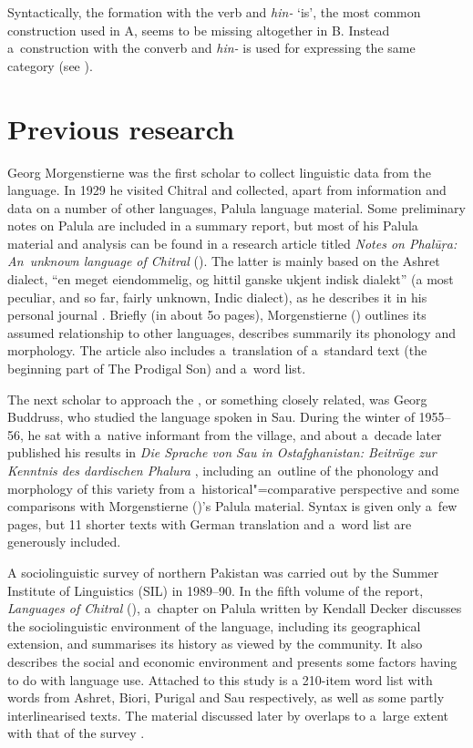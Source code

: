 Syntactically, the  formation with the   verb and \textit{hin-} `is', the most common construction used in A, seems to be missing altogether in B. Instead a~construction with the  converb and \textit{hin-} is used for expressing the same category (see ).


\section{Previous research}
\label{sec:1-5}

Georg Morgenstierne was the first scholar to collect linguistic data from the language. In 1929 he visited Chitral and
collected, apart from information and data on a number of other languages, Palula language material. Some preliminary notes on Palula are included in a summary report, but most of his Palula material and analysis can be found in a research article titled \textit{Notes on Phal\=uṛa: An~unknown \iliDardic language of Chitral}
(\citeyear{morgenstierne1941}). The latter is mainly based on the Ashret dialect, ``en meget eiendommelig, og hittil ganske ukjent indisk dialekt'' (a most peculiar, and so far, fairly unknown, Indic dialect), as he describes it in his personal journal \citep[38]{morgenstiernelorentzen1992}. Briefly (in about 5o pages),
Morgenstierne (\citeyear{morgenstierne1941}) outlines its assumed relationship to other \iliIndoAryan languages, describes summarily its
phonology and morphology. The article also includes a~translation of a~standard text (the beginning part of The Prodigal Son) and
a~word list.


The next scholar to approach the , or something closely related, was Georg
Buddruss, who studied the language spoken in Sau. During the winter of 1955--56, he sat with a~native
informant from the village, and about a~decade later published his results in \textit{Die Sprache
  von Sau in Ostafghanistan: Beiträge zur Kenntnis des dardischen Phalura} \citep{buddruss1967},
including an~outline of the phonology and morphology of this variety from a~historical"=comparative
perspective and some comparisons with Morgenstierne (\citeyear{morgenstierne1941})'s Palula material. Syntax is given only a~few
pages, but 11 shorter texts with German translation and a~word list are generously included.

\largerpage
A sociolinguistic survey of northern Pakistan was carried out by the Summer Institute of Linguistics
(SIL) in 1989--90. In the fifth volume of the report, \textit{Languages of Chitral}
(\citealt{decker1992a}), a~chapter on Palula written by Kendall Decker discusses the
sociolinguistic environment of the language, including its geographical extension, and summarises
its history as viewed by the community. It also describes the social and economic environment and
presents some factors having to do with language use. Attached to this study is a 210-item word list
with words from Ashret, Biori, Purigal and Sau respectively, as well as some partly interlinearised
texts. The material discussed later by \citet{decker1992b,decker1996} overlaps to a~large
extent with that of the survey \citep{decker1992a}.


